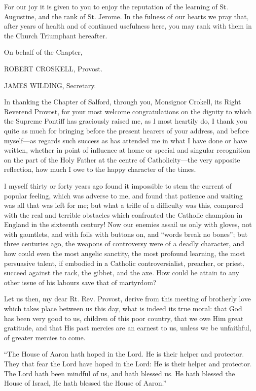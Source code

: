 For our joy it is given to you to enjoy the reputation of the
learning of St. Augustine, and the rank of St. Jerome. In the fulness
of our hearts we pray that, after years of health and of continued
usefulness here, you may rank with them in the Church Triumphant
hereafter.

On behalf of the Chapter,

ROBERT CROSKELL, Provost.

JAMES WILDING, Secretary.


In thanking the Chapter of Salford, through you, Monsignor Crokell,
its Right Reverend Provost, for your most welcome
congratulations on the dignity to which the Supreme Pontiff has
graciously raised me, as I most heartily do, I thank you quite as much
for bringing before the present hearers of your address, and before
myself—as regards such success as has attended me in what I have
done or have written, whether in point of influence at home or special
and singular recognition on the part of the Holy Father at the centre
of Catholicity—the very apposite reflection, how much I owe to the
happy character of the times.

I myself thirty or forty years ago found it impossible to stem the
current of popular feeling, which was adverse to me, and found that
patience and waiting was all that was left for me; but what a trifle
of a difficulty was this, compared with the real and terrible
obstacles which confronted the Catholic champion in England in the
sixteenth century! Now our enemies assail us only with gloves, not
with gauntlets, and with foils with buttons on, and ``words break
no bones''; but three centuries ago, the weapons of controversy
were of a deadly character, and how could even the most angelic
sanctity, the most profound learning, the most persuasive talent, if
embodied in a Catholic controversialist, preacher, or priest, succeed
against the rack, the gibbet, and the axe. How could he attain to any
other issue of his labours save that of martyrdom?

Let us then, my dear Rt. Rev. Provost, derive from this meeting of
brotherly love which takes place between us this day, what is indeed
its true moral: that God has been very good to us, children of this
poor country, that we owe Him great gratitude, and that His past
mercies are an earnest to us, unless we be unfaithful, of greater
mercies to come.

``The House of Aaron hath hoped in the Lord. He is their helper
and protector. They that fear the Lord have hoped in the Lord: He is
their helper and protector. The Lord hath been mindful of us, and hath
blessed us. He hath blessed the House of Israel, He hath blessed the
House of Aaron.''

